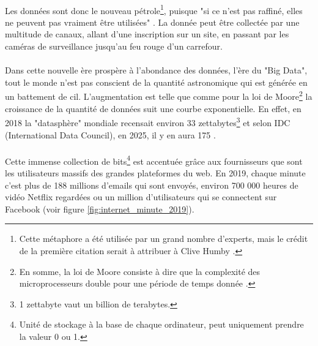 \documentclass[10pt, french, a4paper]{article}
\begin{document}
\paragraph{}
Les données sont donc le nouveau pétrole\footnote{Cette métaphore a été utilisée par un grand nombre d'experts, mais le crédit de la première citation serait à attribuer à Clive Humby \citep{haupt_who_2019}.}, puisque "si ce n'est pas raffiné, elles ne peuvent pas vraiment être utilisées" \citep{haupt_who_2019}. La donnée peut être collectée par une multitude de canaux, allant d'une inscription sur un site, en passant par les caméras de surveillance jusqu'au feu rouge d'un carrefour.

\paragraph{}
Dans cette nouvelle ère prospère à l'abondance des données, l'ère du "Big Data", tout le monde n'est pas conscient de la quantité astronomique qui est générée en un battement de cil. L'augmentation est telle que comme pour la loi de Moore\footnote{En somme, la loi de Moore consiste à dire que la complexité des microprocesseurs double pour une période de temps donnée \citep{moore_cramming_1998}.} la croissance de la quantité de données suit une courbe exponentielle. En effet, en 2018 la "datasphère" mondiale recensait environ 33 zettabytes\footnote{1 zettabyte vaut un billion de terabytes.} et selon IDC (International Data Council), en 2025, il y en aura 175 \citep{reinsel_digitization_2018}.

\paragraph{}
Cette immense collection de bits\footnote{Unité de stockage à la base de chaque ordinateur, peut uniquement prendre la valeur 0 ou 1.} est accentuée grâce aux fournisseurs que sont les utilisateurs massifs des grandes plateformes du web. En 2019, chaque minute c'est plus de 188 millions d'emails qui sont envoyés, environ 700 000 heures de vidéo Netflix regardées ou un million d'utilisateurs qui se connectent sur Facebook (voir figure \ref{fig:internet_minute_2019}).
\end{document}

